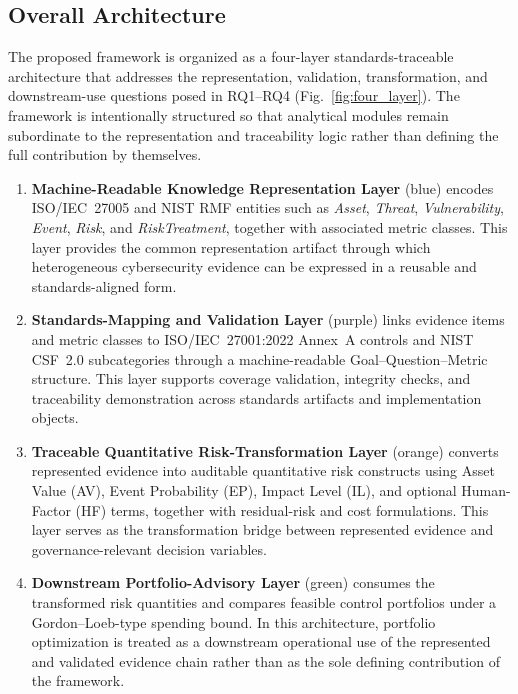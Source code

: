 \documentclass[preprint,12pt]{elsarticle}
\begin{document}
\subsection{Overall Architecture}
\label{sec:overall}

The proposed framework is organized as a four-layer standards-traceable architecture that addresses the representation, validation, transformation, and downstream-use questions posed in RQ1--RQ4 (Fig.~\ref{fig:four_layer}). The framework is intentionally structured so that analytical modules remain subordinate to the representation and traceability logic rather than defining the full contribution by themselves.

\begin{enumerate}[label=\arabic*),leftmargin=*]
  \item \textbf{Machine-Readable Knowledge Representation Layer} (blue) encodes ISO/IEC~27005 and NIST RMF entities such as \textit{Asset}, \textit{Threat}, \textit{Vulnerability}, \textit{Event}, \textit{Risk}, and \textit{RiskTreatment}, together with associated metric classes. This layer provides the common representation artifact through which heterogeneous cybersecurity evidence can be expressed in a reusable and standards-aligned form.

  \item \textbf{Standards-Mapping and Validation Layer} (purple) links evidence items and metric classes to ISO/IEC~27001:2022 Annex~A controls and NIST CSF~2.0 subcategories through a machine-readable Goal--Question--Metric structure. This layer supports coverage validation, integrity checks, and traceability demonstration across standards artifacts and implementation objects.

  \item \textbf{Traceable Quantitative Risk-Transformation Layer} (orange) converts represented evidence into auditable quantitative risk constructs using Asset Value (AV), Event Probability (EP), Impact Level (IL), and optional Human-Factor (HF) terms, together with residual-risk and cost formulations. This layer serves as the transformation bridge between represented evidence and governance-relevant decision variables.

  \item \textbf{Downstream Portfolio-Advisory Layer} (green) consumes the transformed risk quantities and compares feasible control portfolios under a Gordon--Loeb-type spending bound. In this architecture, portfolio optimization is treated as a downstream operational use of the represented and validated evidence chain rather than as the sole defining contribution of the framework.
\end{enumerate}
\end{document}

